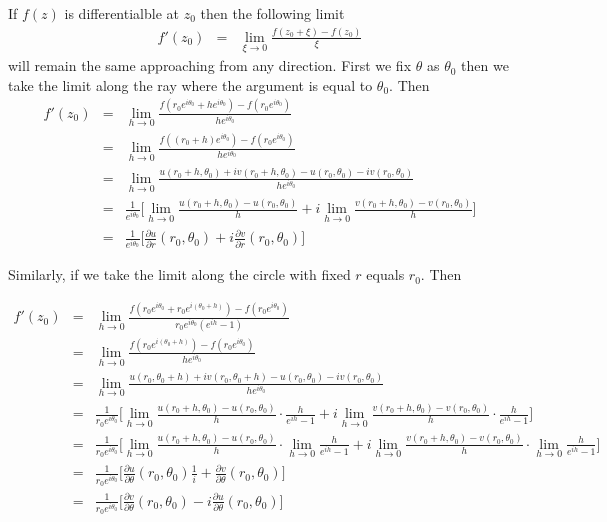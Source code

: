 \documentclass[12pt]{article}
\begin{document}
If $f(z)$ is differentialble at $z_0$ then the following limit
\begin{eqnarray*}
f'(z_0) & = & \lim_{\xi \to 0} \frac{f(z_0+\xi)-f(z_0)}{\xi}
\end{eqnarray*}
will remain the same approaching from any direction.  First we fix $\theta$ as $\theta_0$ then we take the limit along the ray where the argument is equal to $\theta_0$. Then
\begin{eqnarray*}
f'(z_0) & = &  \lim_{h \to 0} \frac{f(r_0e^{i\theta_0} + he^{i\theta_0})-f(r_0e^{i\theta_0})}{he^{i\theta_0}} \\
& = & \lim_{h\to 0} \frac{f((r_0+h)e^{i\theta_0})-f(r_0e^{i\theta_0})}{he^{i\theta_0}} \\
& = & \lim_{h\to 0} \frac{u(r_0+h,\theta_0) + iv(r_0+h,\theta_0) - u(r_0,\theta_0) - iv(r_0,\theta_0)}{he^{i\theta_0}}\\
& = & \frac{1}{e^{i\theta_0}} \Bigg[ \lim_{h\to 0} \frac{u(r_0+h,\theta_0) - u(r_0,\theta_0)}{h} + i \lim_{h\to 0} \frac{v(r_0+h,\theta_0) - v(r_0,\theta_0)}{h} \Bigg]\\
& = & \frac{1}{e^{i\theta_0}}\Bigg[ \frac{\partial u}{\partial r}(r_0,\theta_0) + i\frac{\partial v}{\partial r}(r_0,\theta_0) \Bigg]
\end{eqnarray*}

Similarly, if we take the limit along the circle with fixed $r$ equals $r_0$.  Then

\begin{eqnarray*}
f'(z_0) & = & \lim_{h\to 0} \frac{f(r_0e^{i\theta_0} + r_0e^{i(\theta_0+h)})-f(r_0e^{i\theta_0})}{r_0e^{i\theta_0}(e^{ih}-1)}\\
& = & \lim_{h\to 0} \frac{f(r_0e^{i(\theta_0+h)})-f(r_0e^{i\theta_0})}{he^{i\theta_0}}\\
& = & \lim_{h\to 0} \frac{u(r_0,\theta_0+h) + iv(r_0,\theta_0+h) -u(r_0,\theta_0) - iv(r_0,\theta_0)}{he^{i\theta_0}}\\
& = & \frac{1}{r_0e^{i\theta_0}} \Bigg[ \lim_{h\to 0} \frac{u(r_0+h,\theta_0) - u(r_0,\theta_0)}{h}\cdot \frac{h}{e^{ih}-1} + i \lim_{h\to 0} \frac{v(r_0+h,\theta_0) - v(r_0,\theta_0)}{h}\cdot \frac{h}{e^{ih}-1} \Bigg]\\
& = & \frac{1}{r_0e^{i\theta_0}} \Bigg[ \lim_{h\to 0} \frac{u(r_0+h,\theta_0) - u(r_0,\theta_0)}{h}\cdot \lim_{h\to 0}  \frac{h}{e^{ih}-1} + i \lim_{h\to 0} \frac{v(r_0+h,\theta_0) - v(r_0,\theta_0)}{h}\cdot \lim_{h\to 0} \frac{h}{e^{ih}-1} \Bigg]\\
& = & \frac{1}{r_0e^{i\theta_0}} \Bigg[ \frac{\partial u}{\partial \theta}(r_0,\theta_0)\frac{1}{i} + \frac{\partial v}{\partial \theta}(r_0,\theta_0) \Bigg]\\
& = & \frac{1}{r_0e^{i\theta_0}} \Bigg[ \frac{\partial v}{\partial \theta}(r_0,\theta_0) - i\frac{\partial u}{\partial \theta}(r_0,\theta_0) \Bigg]
\end{eqnarray*}
\end{document}
